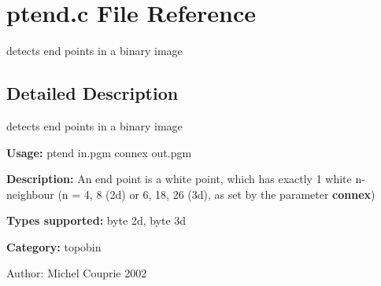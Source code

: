 \section{ptend.c File Reference}
\label{ptend_8c}
detects end points in a binary image 



\subsection{Detailed Description}
detects end points in a binary image 

{\bf Usage:} ptend in.pgm connex out.pgm

{\bf Description:} An end point is a white point, which has exactly 1 white n-neighbour (n = 4, 8 (2d) or 6, 18, 26 (3d), as set by the parameter {\bf connex})

{\bf Types supported:} byte 2d, byte 3d

{\bf Category:} topobin

\begin{Desc}
\item[Author:]Michel Couprie 2002 \end{Desc}
